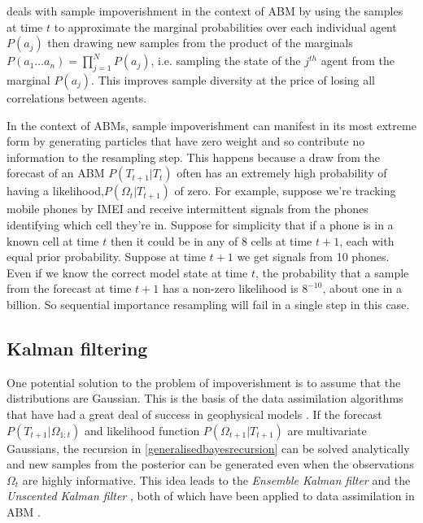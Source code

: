 \documentclass{article}
\begin{document}
\citet{wang_data_2015} deals with sample impoverishment in the context of ABM by using the samples at time $t$ to approximate the marginal probabilities over each individual agent $P(a_j)$ then drawing new samples from the product of the marginals $P(a_1 \dots a_n) = \prod_{j=1}^NP(a_j)$, i.e. sampling the state of the $j^{th}$ agent from the marginal $P(a_j)$. This improves sample diversity at the price of losing all correlations between agents. 

In the context of ABMs, sample impoverishment can manifest in its most extreme form by generating particles that have zero weight and so contribute no information to the resampling step. This happens because a draw from the forecast of an ABM $P(T_{t+1}|T_t)$ often has an extremely high probability of having a likelihood,$P(\Omega_t|T_{t+1})$ of zero. For example, suppose we're tracking mobile phones by IMEI and receive intermittent signals from the phones identifying which cell they're in. Suppose for simplicity that if a phone is in a known cell at time $t$ then it could be in any of 8 cells at time $t+1$, each with equal prior probability. Suppose at time $t+1$ we get signals from 10 phones. Even if we know the correct model state at time $t$, the probability that a sample from the forecast at time $t+1$ has a non-zero likelihood is $8^{-10}$, about one in a billion. So sequential importance resampling will fail in a single step in this case.

\subsection{Kalman filtering}
One potential solution to the problem of impoverishment is to assume that the distributions are Gaussian. This is the basis of the data assimilation algorithms that have had a great deal of success in geophysical models \citet*{carrassi2018data, talagrand_assimilation_1997, kalnay_atmospheric_2003, lewis_dynamic_2006}. If the forecast $P(T_{t+1}|\Omega_{1:t})$ and likelihood function $P(\Omega_{t+1}|T_{t+1})$ are multivariate Gaussians, the recursion in \eqref{generalisedbayesrecursion} can be solved analytically and new samples from the posterior can be generated even when the observations $\Omega_t$ are highly informative. This idea leads to the \textit{Ensemble Kalman filter} \citep{evensen2003ensemble} and the \textit{Unscented Kalman filter} \citep{wan2001unscented}, both of which have been applied to data assimilation in ABM \citep*{ward_dynamic_2016, clay_realtime_2020}.
\end{document}
